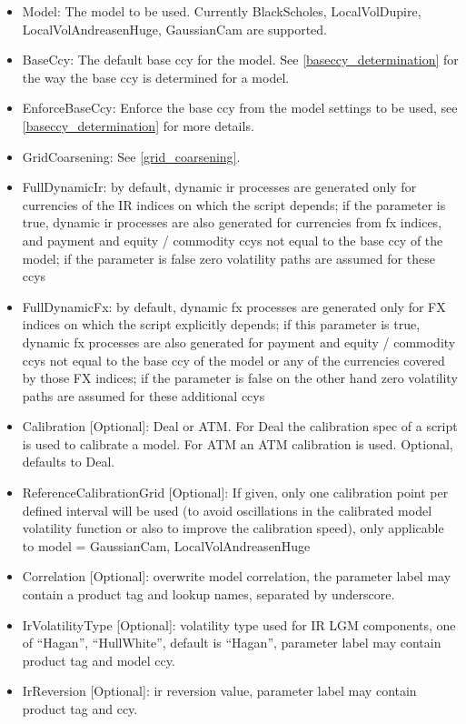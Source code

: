 \begin{itemize}
\item Model: The model to be used. Currently BlackScholes, LocalVolDupire, LocalVolAndreasenHuge, GaussianCam are
  supported.
\item BaseCcy: The default base ccy for the model. See \ref{baseccy_determination} for the way the base ccy is
  determined for a model.
\item EnforceBaseCcy: Enforce the base ccy from the model settings to be used, see \ref{baseccy_determination} for more
  details.
\item GridCoarsening: See \ref{grid_coarsening}.
\item FullDynamicIr: by default, dynamic ir processes are generated only for currencies of the IR indices on which the
  script depends; if the parameter is true, dynamic ir processes are also generated for currencies from fx indices, and
  payment and equity / commodity ccys not equal to the base ccy of the model; if the parameter is false zero volatility
  paths are assumed for these ccys
\item FullDynamicFx: by default, dynamic fx processes are generated only for FX indices on which the script explicitly
  depends; if this parameter is true, dynamic fx processes are also generated for payment and equity / commodity ccys
  not equal to the base ccy of the model or any of the currencies covered by those FX indices; if the parameter is false
  on the other hand zero volatility paths are assumed for these additional ccys
\item Calibration [Optional]: Deal or ATM. For Deal the calibration spec of a script is used to calibrate a model. For
  ATM an ATM calibration is used. Optional, defaults to Deal.
\item ReferenceCalibrationGrid [Optional]: If given, only one calibration point per defined interval will be used (to avoid
  oscillations in the calibrated model volatility function or also to improve the calibration speed), only applicable to
  model = GaussianCam, LocalVolAndreasenHuge
\item Correlation [Optional]: overwrite model correlation, the parameter label may contain a product tag and lookup names,
  separated by underscore.
\item IrVolatilityType [Optional]: volatility type used for IR LGM components, one of ``Hagan'', ``HullWhite'', default is
  ``Hagan'', parameter label may contain product tag and model ccy.
\item IrReversion [Optional]: ir reversion value, parameter label may contain product tag and ccy.

\end{itemize}

